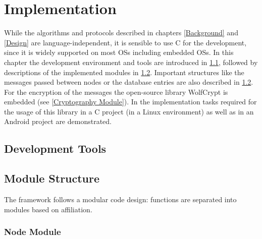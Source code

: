 \chapter{Implementation} \label{Implementation}


While the algorithms and protocols described in chapters \ref{Background} and \ref{Design} are language-independent, it is sensible to use C for the development, since it is widely supported on most \glspl{OS} including embedded \glspl{OS}. In this chapter the development environment and tools are introduced in \ref{Development Tools}, followed by descriptions of the implemented modules in \ref{Module Structure}. Important structures like the messages passed between nodes or the database entries are also described in \ref{Module Structure}. For the encryption of the messages the open-source library WolfCrypt is embedded (see \ref{Cryptography Module}).
In  the implementation tasks required for the usage of this library in a C project (in a Linux environment) as well as in an Android project are demonstrated.

	\section{Development Tools}	\label{Development Tools}
	


	\section{Module Structure} \label{Module Structure}
	
	The framework follows a modular code design: functions are separated into modules based on affiliation.

	
	
	
	\subsection{Node Module} \label{Node Module}

